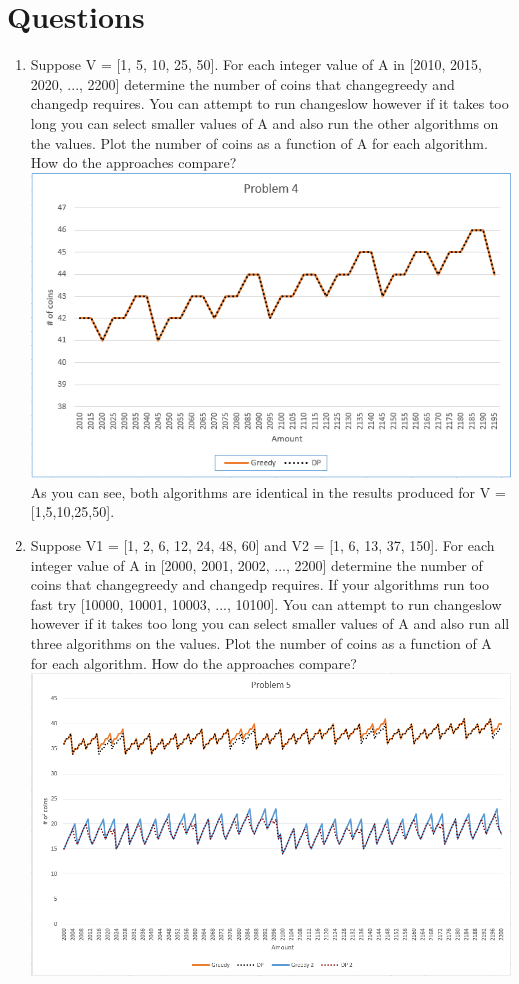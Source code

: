 \documentclass[11pt,letterpaper]{article}
\begin{document}
\section*{Questions}
\begin{enumerate}
	\item Suppose V = [1, 5, 10, 25, 50]. For each integer value of A in [2010, 2015, 2020, ..., 2200] determine the number of coins that changegreedy and changedp requires. You can attempt to run changeslow however if it takes too long you can select smaller values of A and also run the other algorithms on the values. Plot the number of coins as a function of A for each algorithm. How do the approaches compare?
	\includegraphics[width=6in]{p4.png}
	As you can see, both algorithms are identical in the results produced for V = [1,5,10,25,50].
	\item Suppose V1 = [1, 2, 6, 12, 24, 48, 60] and V2 = [1, 6, 13, 37, 150]. For each integer value of A in [2000, 2001, 2002, ..., 2200] determine the number of coins that changegreedy and changedp requires. If your algorithms run too fast try [10000, 10001, 10003, ..., 10100]. You can attempt to run changeslow however if it takes too long you can select smaller values of A and also run all three algorithms on the values. Plot the number of coins as a function of A for each algorithm. How do the approaches compare?
	\includegraphics[width=6in]{p5.png}\\

\end{enumerate}
\end{document}
